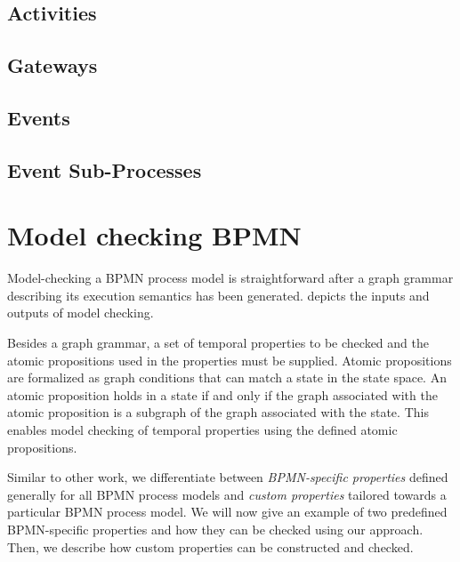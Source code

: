 \documentclass[adraft, copyright, creativecommons]{eptcs} %
\begin{document}
\subsection{Activities}
\subsection{Gateways}
\subsection{Events}

\subsection{Event Sub-Processes}
\section{Model checking BPMN} \label{sec:modelChecking}

Model-checking a BPMN process model is straightforward after a graph grammar describing its execution semantics has been generated.
 depicts the inputs and outputs of model checking.

Besides a graph grammar, a set of temporal properties to be checked and the atomic propositions used in the properties must be supplied.
Atomic propositions are formalized as graph conditions that can match a state in the state space.
An atomic proposition holds in a state if and only if the graph associated with the atomic proposition is a subgraph of the graph associated with the state. %
This enables model checking of temporal properties using the defined atomic propositions.

Similar to other work, we differentiate between \emph{BPMN-specific properties} defined generally for all BPMN process models and \emph{custom properties} tailored towards a particular BPMN process model.
We will now give an example of two predefined BPMN-specific properties and how they can be checked using our approach.
Then, we describe how custom properties can be constructed and checked.
\end{document}
